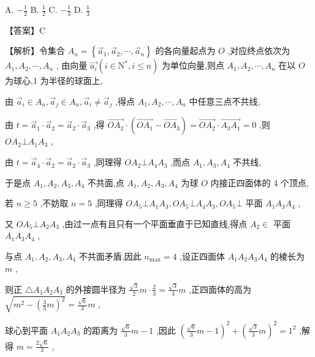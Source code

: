 \documentclass[10pt]{article}
\begin{document}
A. \(- \frac{1}{2}\) B. \(\frac{1}{2}\) C. \(- \frac{1}{3}\) D. \(\frac{1}{3}\)

【答案】C

【解析】令集合 \({A}_{n} = \left\{  {{\overrightarrow{a}}_{1},{\overrightarrow{a}}_{2},\cdots ,{\overrightarrow{a}}_{n}}\right\}\) 的各向量起点为 \(O\) ,对应终点依次为 \({A}_{1},{A}_{2},\cdots ,{A}_{n}\) , 由向量 \(\overrightarrow{{a}_{i}}\left( {i \in  {\mathrm{N}}^{ * },i \leq  n}\right)\) 为单位向量,则点 \({A}_{1},{A}_{2},\cdots ,{A}_{n}\) 在以 \(O\) 为球心,1 为半径的球面上,

由 \({\overrightarrow{a}}_{i} \in  {A}_{n},{\overrightarrow{a}}_{j} \in  {A}_{n},{\overrightarrow{a}}_{i} \neq  {\overrightarrow{a}}_{j}\) ,得点 \({A}_{1},{A}_{2},\cdots ,{A}_{n}\) 中任意三点不共线,

由 \(t = {\overrightarrow{a}}_{1} \cdot  {\overrightarrow{a}}_{2} = {\overrightarrow{a}}_{2} \cdot  {\overrightarrow{a}}_{3}\) ,得 \(\overrightarrow{O{A}_{2}} \cdot  \left( {\overrightarrow{O{A}_{1}} - \overrightarrow{O{A}_{3}}}\right)  = \overrightarrow{O{A}_{2}} \cdot  \overrightarrow{{A}_{3}{A}_{1}} = 0\) ,则 \(O{A}_{2} \bot  {A}_{1}{A}_{3}\) ,

由 \(t = {\overrightarrow{a}}_{4} \cdot  {\overrightarrow{a}}_{2} = {\overrightarrow{a}}_{2} \cdot  {\overrightarrow{a}}_{3}\) ,同理得 \(O{A}_{2} \bot  {A}_{4}{A}_{3}\) ,而点 \({A}_{1},{A}_{3},{A}_{4}\) 不共线,

于是点 \({A}_{1},{A}_{2},{A}_{3},{A}_{4}\) 不共面,点 \({A}_{1},{A}_{2},{A}_{3},{A}_{4}\) 为球 \(O\) 内接正四面体的 4 个顶点,

若 \(n \geq  5\) ,不妨取 \(n = 5\) ,同理得 \(O{A}_{5} \bot  {A}_{1}{A}_{3},O{A}_{5} \bot  {A}_{4}{A}_{3},O{A}_{5} \bot\) 平面 \({A}_{1}{A}_{3}{A}_{4}\) ,

又 \(O{A}_{5} \bot  {A}_{2}{A}_{3}\) ,由过一点有且只有一个平面垂直于已知直线,得点 \({A}_{2} \in\) 平面 \({A}_{1}{A}_{3}{A}_{4}\) ,

与点 \({A}_{1},{A}_{2},{A}_{3},{A}_{4}\) 不共面矛盾,因此 \({n}_{\max } = 4\) ,设正四面体 \({A}_{1}{A}_{2}{A}_{3}{A}_{4}\) 的棱长为 \(m\) ,

则正 \(\bigtriangleup {A}_{1}{A}_{2}{A}_{3}\) 的外接圆半径为 \(\frac{\sqrt{3}}{2}m \cdot  \frac{2}{3} = \frac{\sqrt{3}}{3}m\) ,正四面体的高为 \(\sqrt{{m}^{2} - {\left( \frac{3}{3}m\right) }^{2}} = \frac{\sqrt{6}}{3}m\) ,

球心到平面 \({A}_{1}{A}_{2}{A}_{3}\) 的距离为 \(\frac{\sqrt{6}}{3}m - 1\) ,因此 \({\left( \frac{\sqrt{6}}{3}m - 1\right) }^{2} + {\left( \frac{\sqrt{3}}{3}m\right) }^{2} = {1}^{2}\) ,解得 \(m = \frac{2\sqrt{6}}{3}\) ,
\end{document}
